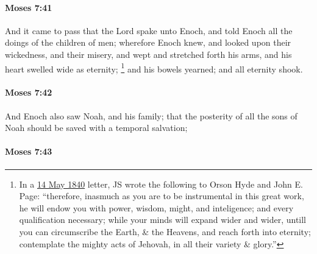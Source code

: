 		\paragraph{Moses 7:41} %
			\label{MOSES-7-41}

			And it came to pass that the Lord spake unto Enoch, and told Enoch all the doings of the children of men; wherefore Enoch knew, and looked upon their wickedness, and their misery, and wept and stretched forth his arms, and his heart swelled wide as eternity;%
				\footnote{%
					In a \hyperref[EMS-1840-JS-14-MAY-1840]{14 May 1840} letter, JS wrote the following to Orson Hyde and John E. Page: ``therefore, inasmuch as you are to be instrumental in this great work, he will endow you with power, wisdom, might, and inteligence; and every qualification necessary; while your minds will expand wider and wider, untill you can circumscribe the Earth, \& the Heavens, and reach forth into eternity; contemplate the mighty acts of Jehovah, in all their variety \& glory.''
					}
			and his bowels yearned; and all eternity shook.


		\paragraph{Moses 7:42} %
			\label{MOSES-7-42}

			And Enoch also saw Noah, and his family; that the posterity of all the sons of Noah should be saved with a temporal salvation;


		\paragraph{Moses 7:43} %
			\label{MOSES-7-43}

